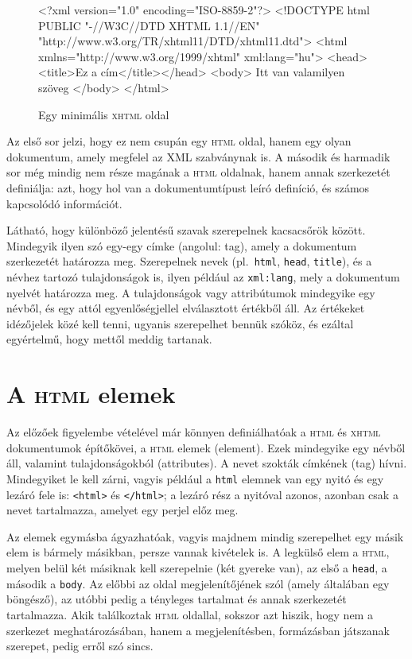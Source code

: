 \begin{figure}[tbh]\center
\begin{VerbExampleNum}
<?xml version="1.0" encoding="ISO-8859-2"?>
<!DOCTYPE html PUBLIC "-//W3C//DTD XHTML 1.1//EN"
"http://www.w3.org/TR/xhtml11/DTD/xhtml11.dtd">
<html xmlns="http://www.w3.org/1999/xhtml" xml:lang="hu">
<head><title>Ez a cím</title></head>
<body>
Itt van valamilyen szöveg
</body>
</html>
\end{VerbExampleNum}
   \caption{Egy minimális \textsc{xhtml} oldal}
  \label{fig:xhtml-minimal}
\end{figure}


Az első sor jelzi, hogy ez nem csupán egy \textsc{html} oldal, hanem egy olyan
dokumentum,
amely megfelel az XML szabványnak \cite{xml} is. A második és harmadik sor még
mindig nem része magának a \textsc{html} oldalnak, hanem annak szerkezetét
definiálja: azt, hogy hol van a dokumentumtípust leíró definíció, és számos
kapcsolódó információt.

Látható, hogy különböző jelentésű szavak szerepelnek kacsacsőrök
között. Mindegyik ilyen szó egy-egy címke (angolul: tag), amely a dokumentum
szerkezetét határozza meg. Szerepelnek nevek (pl.\ \texttt{html}, \texttt{head},
\texttt{title}), és
a névhez tartozó tulajdonságok is, ilyen például az \texttt{xml:lang}, mely a
dokumentum nyelvét határozza meg. A tulajdonságok vagy attribútumok mindegyike
egy névből, és egy attól egyenlőségjellel elválasztott értékből áll. Az
értékeket idézőjelek közé kell tenni, ugyanis szerepelhet bennük szóköz, és
ezáltal egyértelmű, hogy mettől meddig tartanak.


\section{A \textsc{html} elemek}
Az előzőek figyelembe vételével már könnyen definiálhatóak a \textsc{html} és
\textsc{xhtml} dokumentumok építőkövei, a \textsc{html} elemek (element). Ezek
mindegyike egy névből áll, valamint tulajdonságokból (attributes). A nevet
szokták címkének (tag) hívni. Mindegyiket le kell zárni, vagyis például a
\texttt{html} elemnek van egy nyitó és egy lezáró fele is: \verb|<html>| és
\verb|</html>|; a lezáró rész a nyitóval azonos, azonban csak a nevet
tartalmazza, amelyet egy perjel előz meg.

Az elemek egymásba ágyazhatóak, vagyis majdnem mindig szerepelhet egy másik elem
is bármely másikban, persze vannak kivételek is. A legkülső elem a
\textsc{html}, melyen belül két másiknak kell szerepelnie (két gyereke
van), az első a \texttt{head}, a második a \texttt{body}. Az előbbi az oldal
megjelenítőjének szól (amely általában egy böngésző), az utóbbi pedig a
tényleges tartalmat és annak szerkezetét tartalmazza. Akik találkoztak
\textsc{html} oldallal, sokszor azt hiszik, hogy nem a szerkezet
meghatározásában, hanem a megjelenítésben, formázásban játszanak szerepet, pedig
erről szó sincs.

